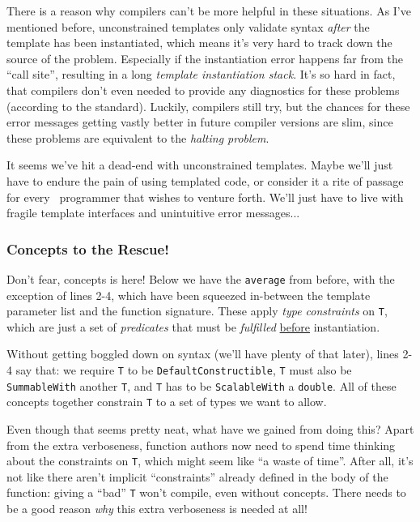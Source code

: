 There is a reason why compilers can't be more helpful in these situations. As I've mentioned before, unconstrained templates only validate syntax \emph{after} the template has been instantiated, which means it's very hard to track down the source of the problem. Especially if the instantiation error happens far from the ``call site'', resulting in a long \emph{template instantiation stack}. It's so hard in fact, that compilers don't even needed to provide any diagnostics for these problems (according to the standard). Luckily, compilers still try, but the chances for these error messages getting vastly better in future compiler versions are slim, since these problems are equivalent to the \emph{halting problem}.

It seems we've hit a dead-end with unconstrained templates. Maybe we'll just have to endure the pain of using templated code, or consider it a rite of passage for every \Cpp\ programmer that wishes to venture forth. We'll just have to live with fragile template interfaces and unintuitive error messages...

    \subsubsection*{Concepts to the Rescue!}

    Don't fear, concepts is here! Below we have the \texttt{average} from before, with the exception of lines 2-4, which have been squeezed in-between the template parameter list and the function signature. These apply \emph{type constraints} on \texttt{T}, which are just a set of \emph{predicates} that must be \emph{fulfilled} \underline{before} instantiation.

    Without getting boggled down on syntax (we'll have plenty of that later), lines 2-4 say that: we require \texttt{T} to be \texttt{DefaultConstructible}, \texttt{T} must also be \texttt{SummableWith} another \texttt{T}, and \texttt{T} has to be \texttt{ScalableWith} a \texttt{double}. All of these concepts together constrain \texttt{T} to a set of types we want to allow.

    

    \noindent Even though that seems pretty neat, what have we gained from doing this? Apart from the extra verboseness, function authors now need to spend  time thinking about the constraints on \texttt{T}, which might seem like ``a waste of time''. After all, it's not like there aren't implicit ``constraints'' already defined in the body of the function: giving a ``bad'' \texttt{T} won't compile, even without concepts. There needs to be a good reason \emph{why} this extra verboseness is needed at all!

